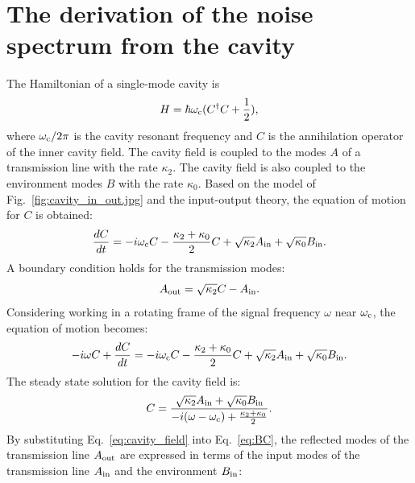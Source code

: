 \newpage
\section{The derivation of the noise spectrum from the cavity} 
\label{sec:cavitynoise}

The Hamiltonian of a single-mode cavity is
\begin{equation}
\label{eq:cavity_Hamiltonian}
    H = \hbar \omega_{\rm c}(C^{\dagger}C+\frac{1}{2}),
\end{equation}
where $\omega_{\rm c}/2\pi$ is the cavity resonant frequency and $C$ is the 
annihilation operator of the inner cavity field. The cavity field is coupled 
to the modes $A$ of a transmission line with the rate $\kappa_2$. The cavity 
field is also coupled to the environment modes $B$ with the rate $\kappa_0$. 
Based on the model of Fig.~\ref{fig:cavity_in_out.jpg} and the input-output 
theory, the equation of motion for $C$ is obtained:
\begin{equation}
\label{eq:EOM}
    \frac{dC}{dt} = -i\omega_{\rm c} C - \frac{\kappa_2+\kappa_0}{2} C + \sqrt{\kappa_2} A_{\rm in} + \sqrt{\kappa_0}B_{\rm in}.
\end{equation}
A boundary condition holds for the transmission modes:
\begin{equation}
\label{eq:BC}
    A_{\rm out} = \sqrt{\kappa_2} C - A_{\rm in}.
\end{equation}
Considering working in a rotating frame of the signal frequency $\omega$ near 
$\omega_{\rm c}$, the equation of motion becomes:
\begin{equation}
\label{eq:EOM_rotating_frame}
    -i\omega C + \frac{dC}{dt} = -i \omega_{\rm c} C - \frac{\kappa_2+\kappa_0}{2} C + \sqrt{\kappa_2} A_{\rm in} + \sqrt{\kappa_0} B_{\rm in}.
\end{equation}
The steady state solution for the cavity field is: 
\begin{equation}
\label{eq:cavity_field}
    C = \frac {\sqrt{\kappa_2} A_{\rm in} + \sqrt{\kappa_0} B_{\rm in}} {-i (\omega-\omega_{\rm c}) + \frac{\kappa_2+\kappa_0}{2} }.
\end{equation}
By substituting Eq.~\eqref{eq:cavity_field} into Eq.~\eqref{eq:BC}, the 
reflected modes of the transmission line $A_{\rm out}$ are expressed in terms 
of the input modes of the transmission line $A_{\rm in}$ and the environment 
$B_{\rm in}$:
